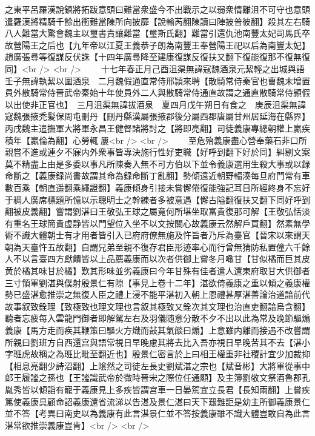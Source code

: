 之東平呂羅漢說鎮將拓跋意頭曰難當衆盛今不出戰示之以弱衆情離沮不可守也意頭遣羅漢將精騎千餘出衝難當陳所向披靡【說輸芮翻陳讀曰陣披普彼翻】殺其左右騎八人難當大驚會魏主以璽書責讓難當【璽斯氏翻】難當引還仇池南豐太妃司馬氏卒故營陽王之后也【九年帝以江夏王義恭子朗為南豐王奉營陽王祀以后為南豐太妃】　趙廣張尋等復謀反伏誅【十四年廣尋降至建康復謀反復扶又翻下復能復那不復無復同】<br />
<br />
　　十七年春正月己酉沮渠無諱寇魏酒泉元絜輕之出城與語壬子無諱執絜以圍酒泉　二月魏假通直常侍邢頴來聘【散騎常侍秦官也曹魏末增置員外散騎常侍晉武帝秦始十年使員外二人與散騎常侍通直故謂之通直散騎常侍頴假以出使非正官也】　三月沮渠無諱拔酒泉　夏四月戊午朔日有食之　庚辰沮渠無諱寇魏張掖禿髪保周屯刪丹【刪丹縣漢屬張掖郡後分屬西郡唐屬甘州居延海在縣界】丙戌魏主遣撫軍大將軍永昌王健督諸將討之【將即亮翻】司徒義康專總朝權上羸疾積年【羸倫為翻】心勞輒屢<br />
<br />
　　至危殆義康盡心營奉藥石非口所親嘗不進或連夕不寐内外衆事皆專決施行性好吏職【好呼到翻下好於同】糾剔文案莫不精盡上由是多委以事凡所陳奏入無不可方伯以下並令義康選用生殺大事或以録命斷之【義康録尚書故謂其命為録命斷丁亂翻】勢傾遠近朝野輻湊每旦府門常有車數百乘【朝直遥翻乘繩證翻】義康傾身引接未嘗懈倦復能強記耳目所經終身不忘好于稠人廣席標題所憶以示聰明士之幹練者多被意遇【懈古隘翻復扶又翻下同好呼到翻被皮義翻】嘗謂劉湛曰王敬弘王球之屬竟何所堪坐取富貴復那可解【王敬弘恬淡有重名王球簡貴虚静皆以門望位入坐不以文按關心故義康云然解戶買翻】然素無學術不識大體朝士有才用者皆引入已府府僚無施及忤旨者乃斥為臺官【晉宋以來謂天朝為天臺忤五故翻】自謂兄弟至親不復存君臣形迹率心而行曾無猜防私置僮六千餘人不以言臺四方獻饋皆以上品薦義康而以次者供御上嘗冬月噉甘【甘似橘而巨其皮黄於橘其味甘於橘】歎其形味並劣義康曰今年甘殊有佳者遣人還東府取甘大供御者三寸領軍劉湛與僕射殷景仁有隙【事見上卷十二年】湛欲倚義康之重以傾之義康權勢已盛湛愈推崇之無復人臣之禮上浸不能平湛初入朝上恩禮甚厚湛善論治道諳前代故事叙致銓理【致極致也理文理也言叙其極致又銓次其文理也治直吏翻諳烏含翻】聽者忘疲每入雲龍門御者即解駕左右及羽儀随意分散不夕不出以此為常及晚節驅煽義康【馬方走而疾其鞭策曰驅火方熾而鼔其氣燄曰煽】上意雖内離而接遇不改嘗謂所親曰劉班方自西還宫與語常視日早晚慮其將去比入吾亦視日早晚苦其不去【湛小字班虎故稱之為班比毗至翻近也】殷景仁密言於上曰相王權重非社稷計宜少加裁抑【相息亮翻少詩沼翻】上隂然之司徒左長史劉斌湛之宗也【斌音彬】大將軍從事中郎王履謐之孫也【王謐識武帝於微時晉宋之際位任通顯】及主簿劉敬文祭酒魯郡孔胤秀皆以傾謟有寵于義康見上多疾皆謂宫車一日晏駕宜立長君【長知兩翻】上嘗疾篤使義康具顧命詔義康還省流涕以告湛及景仁湛曰天下艱難詎是幼主所御義康景仁並不答【考異曰南史以為義康有此言湛景仁並不答按義康雖不識大體豈敢自為此言湛常欲推崇義康豈肯】<br />
<br />
